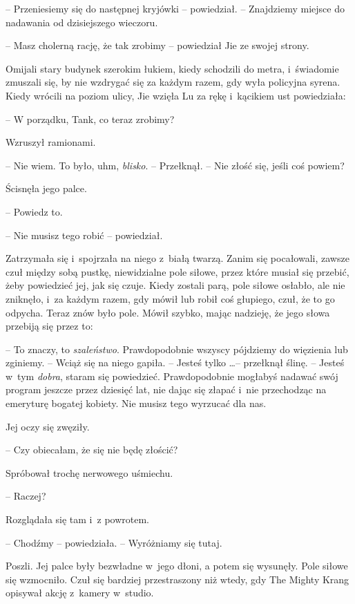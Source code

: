 \documentclass[oneside,polish,11pt,rmheadings]{mwbk}
\begin{document}
-- Przeniesiemy się do następnej kryjówki -- powiedział. -- Znajdziemy miejsce do nadawania od dzisiejszego wieczoru.

-- Masz cholerną rację, że tak zrobimy -- powiedział Jie ze swojej strony.

Omijali stary budynek szerokim łukiem, kiedy schodzili do metra, i~świadomie zmuszali się, by nie wzdrygać się za każdym razem, gdy wyła policyjna syrena. Kiedy wrócili na poziom ulicy, Jie wzięła Lu za rękę i~kącikiem ust powiedziała: 

-- W porządku, Tank, co teraz zrobimy?

Wzruszył ramionami. 

-- Nie wiem. To było, uhm, \textit{blisko}. -- Przełknął. -- Nie złość się, jeśli coś powiem?

Ścisnęła jego palce. 

-- Powiedz to. 

-- Nie musisz tego robić -- powiedział. 

Zatrzymała się i~spojrzała na niego z~białą twarzą. Zanim się pocałowali, zawsze czuł między sobą pustkę, niewidzialne pole siłowe, przez które musiał się przebić, żeby powiedzieć jej, jak się czuje. Kiedy zostali parą, pole siłowe osłabło, ale nie zniknęło, i~za każdym razem, gdy mówił lub robił coś głupiego, czuł, że to go odpycha. Teraz znów było pole. Mówił szybko, mając nadzieję, że jego słowa przebiją się przez to: 

-- To znaczy, to \textit{szaleństwo}. Prawdopodobnie wszyscy pójdziemy do więzienia lub zginiemy. -- Wciąż się na niego gapiła. -- Jesteś tylko \ldots  -- przełknął ślinę. -- Jesteś w~tym \textit{dobra}, staram się powiedzieć. Prawdopodobnie mogłabyś nadawać swój program jeszcze przez dziesięć lat, nie dając się złapać i~nie przechodząc na emeryturę bogatej kobiety. Nie musisz tego wyrzucać dla nas.

Jej oczy się zwęziły. 

-- Czy obiecałam, że się nie będę złościć?

Spróbował trochę nerwowego uśmiechu. 

-- Raczej?

Rozglądała się tam i~z powrotem. 

-- Chodźmy -- powiedziała. -- Wyróżniamy się tutaj. 

Poszli. Jej palce były bezwładne w~jego dłoni, a potem się wysunęły. Pole siłowe się wzmocniło. Czuł się bardziej przestraszony niż wtedy, gdy The Mighty Krang opisywał akcję z~kamery w~studio. 
\end{document}
